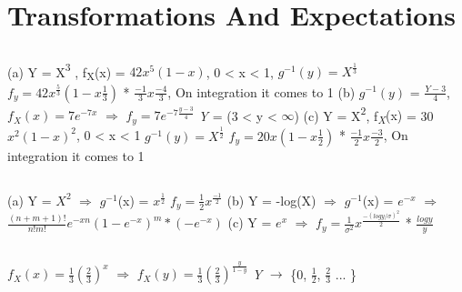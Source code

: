 \documentclass{report}
\begin{document}
\setcounter{chapter}{1}
\chapter{Transformations And Expectations}

\section{}
(a) Y = X{\textsuperscript{3}} , f{\textsubscript{X}}(x) = {$42x^{5}(1-x)$}, 0 < x < 1, 
{$g^{-1}(y) = X^{\frac{1}{3}}$}
{$f_{y} = 42x^{\frac{5}{3}}(1 - x{\frac{1}{3}})$} * {$\frac{-1}{3}x{\frac{-4}{3}}$}, On integration it comes to 1
{\newline}
(b) {$g^{-1}(y)$ = {$\frac{Y-3}{4}$}}, {$f_{X}(x) = 7e^{-7x}$} {$\Rightarrow$} {$f_{y} = 7e^{-7{\frac{y-3}{4}}}$} {\textit{Y}} = (3 < y < {$\infty$})
{\newline}
(c) Y = X{\textsuperscript{2}}, f{\textsubscript{{\textit{X}}}(x)} = 30{$x^{2}(1-x)^{2}$}, 0 < x < 1
{$g^{-1}(y) = X^{\frac{1}{2}}$}
{$f_{y} = 20x(1 - x{\frac{1}{2}})$} * {$\frac{-1}{2}{x{\frac{-3}{2}}}$}, On integration it comes to 1
{\newline}

\section{}
(a) Y = {$X^{2}$} {$\Rightarrow$} {$g^{-1}$}(x) = {$x^{\frac{1}{2}}$}
{$f_{y} = \frac{1}{2}x^{\frac{-1}{2}}$}
{\newline}
(b) Y = -log(X) {$\Rightarrow$} {$g^{-1}$}(x) = {$e^{-x}$} {$\Rightarrow$} {$\frac{(n+m+1)!}{n!m!}e^{-xn}(1-e^{-x})^{m} * (-e^{-x}) $}
{\newline}
(c) Y = {$e^x$} {$\Rightarrow$} {$f_{y} = \frac{1}{\sigma^{2}}x^{\frac{-(log y/\sigma)^{2}}{2}}$} * {$\frac{log y}{y}$}
{\newline}

\section{}
{$f_{X}(x) = {\frac{1}{3}}({\frac{2}{3}})^{x}$} {$\Rightarrow$} {$f_{X}(y) = {\frac{1}{3}}({\frac{2}{3}})^{\frac{y}{1-y}}$} {\textit{Y}} {$\rightarrow$} \{0, {$\frac{1}{2}$}, {$\frac{2}{3}$} ... \}
\end{document}
